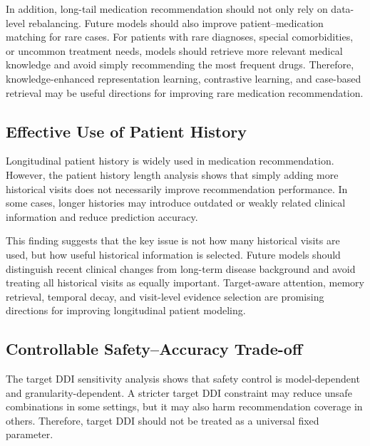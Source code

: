 \documentclass[manuscript,review]{acmart}
\begin{document}
In addition, long-tail medication recommendation should not only rely on data-level rebalancing. Future models should also improve patient--medication matching for rare cases. For patients with rare diagnoses, special comorbidities, or uncommon treatment needs, models should retrieve more relevant medical knowledge and avoid simply recommending the most frequent drugs. Therefore, knowledge-enhanced representation learning, contrastive learning, and case-based retrieval may be useful directions for improving rare medication recommendation.

\subsection{Effective Use of Patient History}

Longitudinal patient history is widely used in medication recommendation. However, the patient history length analysis shows that simply adding more historical visits does not necessarily improve recommendation performance. In some cases, longer histories may introduce outdated or weakly related clinical information and reduce prediction accuracy.

This finding suggests that the key issue is not how many historical visits are used, but how useful historical information is selected. Future models should distinguish recent clinical changes from long-term disease background and avoid treating all historical visits as equally important. Target-aware attention, memory retrieval, temporal decay, and visit-level evidence selection are promising directions for improving longitudinal patient modeling.

\subsection{Controllable Safety--Accuracy Trade-off}

The target DDI sensitivity analysis shows that safety control is model-dependent and granularity-dependent. A stricter target DDI constraint may reduce unsafe combinations in some settings, but it may also harm recommendation coverage in others. Therefore, target DDI should not be treated as a universal fixed parameter.
\end{document}
